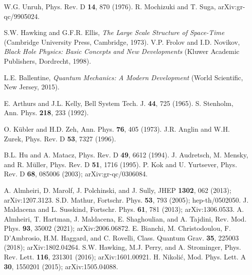 \documentclass[12pt]{article}
\begin{document}
\begin{thebibliography}{99}
W.G. Unruh, Phys. Rev. D {\bf 14}, 870 (1976).
R. Mochizuki and T. Suga, arXiv:gr-qc/9905024.

S.W. Hawking and G.F.R. Ellis, {\it The Large Scale Structure of Space-Time}
(Cambridge University Press, Cambridge, 1973).
V.P. Frolov and I.D. Novikov, {\it Black Hole Physics: Basic Concepts and New Developments}
(Kluwer Academic Publishers, Dordrecht, 1998).

L.E. Ballentine, {\it Quantum Mechanics: A Modern Development} (World Scientific, New Jersey, 2015).

E. Arthurs and J.L. Kelly, Bell System Tech. J. {\bf 44}, 725 (1965). 
S. Stenholm, Ann. Phys. {\bf 218}, 233 (1992).

O. K\"ubler and H.D. Zeh, Ann. Phys. {\bf 76}, 405 (1973).
J.R. Anglin and W.H. Zurek, Phys. Rev. D {\bf 53}, 7327 (1996).

B.L. Hu and A. Matacz, Phys. Rev. D {\bf 49}, 6612 (1994).
J. Audretsch, M. Mensky, and R. M\"uller, Phys. Rev. D {\bf 51}, 1716 (1995).
P. Kok and U. Yurtsever, Phys. Rev. D {\bf 68}, 085006 (2003); arXiv:gr-qc/0306084.

A. Almheiri, D. Marolf, J. Polchinski, and J. Sully, JHEP {\bf 1302}, 062 (2013); arXiv:1207.3123.
S.D. Mathur, Fortschr. Phys. {\bf 53}, 793 (2005); hep-th/0502050.
J. Maldacena and L. Susskind, Fortschr. Phys. {\bf 61}, 781 (2013); arXiv:1306.0533.
A. Almheiri, T. Hartman, J. Maldacena, E. Shaghoulian, and A. Tajdini, Rev. Mod. Phys. {\bf 93}, 35002 (2021); 
arXiv:2006.06872.
E. Bianchi, M. Christodoulou, F. D'Ambrosio, H.M. Haggard, and C. Rovelli, 
Class. Quantum Grav. {\bf 35}, 225003 (2018); arXiv:1802.04264.
S.W. Hawking, M.J. Perry, and A. Strominger, Phys. Rev. Lett. {\bf 116}, 231301 (2016); arXiv:1601.00921.
H. Nikoli\'c, Mod. Phys. Lett. A {\bf 30}, 1550201 (2015); arXiv:1505.04088.


 

\end{thebibliography}
\end{document}
